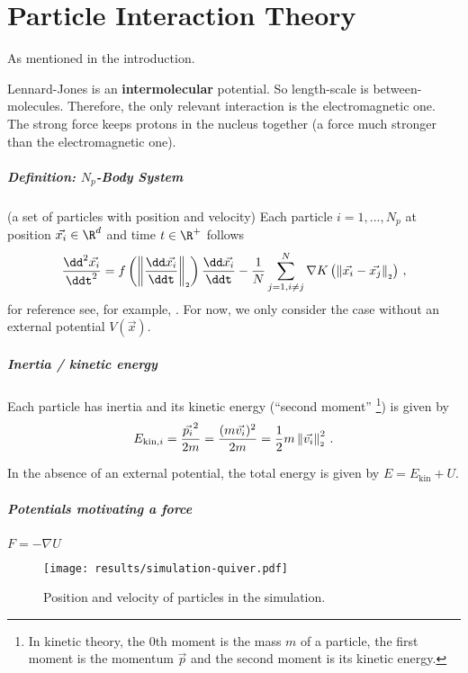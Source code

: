 \chapter{Particle Interaction Theory}
\label{chap:particle-interaction-theory}

As mentioned in the introduction.

Lennard-Jones is an \textbf{intermolecular} potential.
So length-scale is between-molecules.
Therefore, the only relevant interaction is the electromagnetic one.
The strong force keeps protons in the nucleus together (a force much stronger than the electromagnetic one).

\paragraph{Definition: $N_p$-Body System}
(a set of particles with position and velocity)
Each particle $i=1, ..., N_p$ at position $\vec{x_i} \in \R^d$ and time $t \in \R^+$ follows
$$\frac{\dd^2 \vec{x_i}}{\ddt^2} = f\left(\norm{\frac{\dd \vec{x_i}}{\ddt}}\right) \frac{\dd\vec{x_i}}{\ddt} - \frac{1}{N} \sum_{j=1, i\neq j}^{N} \nabla K\left(\norm{\vec{x_i} - \vec{x_j}}\right)\,,$$
for reference see, for example, \parencite{2020-power-law-kernels, 2021-arbitrary-dimensions}.
For now, we only consider the case without an external potential $V(\vec{x})$.

\paragraph{Inertia / kinetic energy}
Each particle has inertia and its kinetic energy (``second moment'' \footnote{
  In kinetic theory, the $0$th moment is the mass $m$ of a particle, the first moment is the momentum $\vec{p}$ and the second moment is its kinetic energy.
}) is given by
$$E_{\text{kin},i} = \frac{\vec{p_i}^2}{2m} = \frac{(m \vec{v_i})^2}{2m} = \frac{1}{2} m \left\lVert\vec{v_i}\right\rVert_{\scriptscriptstyle 2}^2\,.$$

In the absence of an external potential, the total energy is given by $E = E_{\text{kin}} + U$.

\paragraph{Potentials motivating a force}
\(F = -\nabla U\)

\begin{figure}[H]
  \centering
  \label{fig:simulation-quiver-illustration}
  \texttt{[image: results/simulation-quiver.pdf]}
  \caption{Position and velocity of particles in the simulation.}
\end{figure}

